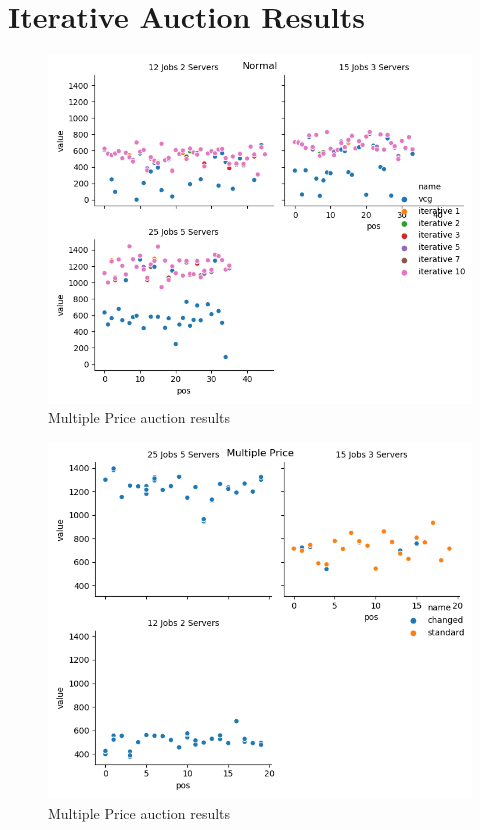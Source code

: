 \section{Iterative Auction Results}\label{sec:auctions-results}
\begin{figure}[H]
    \centering
    \includegraphics[width=1\linewidth]{./images/single_price_auction_results.png}
    \caption{Multiple Price auction results}
\end{figure}
\begin{figure}[H]
    \centering
    \includegraphics[width=1\linewidth]{./images/multiple_price_auction_results.png}
    \caption{Multiple Price auction results}
\end{figure}
